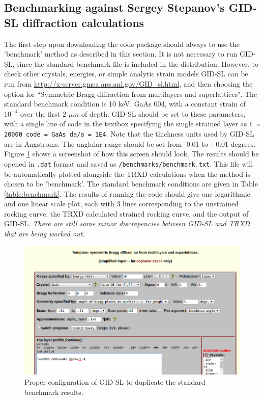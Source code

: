 \documentclass[letterpaper,11pt]{article}
\begin{document}
\subsection{Benchmarking against Sergey Stepanov's GID-SL diffraction calculations}
The first step upon downloading the code package should always to use the 'benchmark' method as described in this section.  It is not necessary to run GID-SL, since the standard benchmark file is included in the distribution.  However, to check other crystals, energies, or simple analytic strain models GID-SL can be run from \url{http://x-server.gmca.aps.anl.gov/GID_sl.html}, and then choosing the option for ``Symmetric Bragg diffraction from multilayers and superlattices". The standard benchmark condition is 10 keV, GaAs 004, with a constant strain of $10^{-4}$ over the first 2 $\mu m$ of depth. GID-SL should be set to these parameters, with a single line of code in the textbox specifying the single strained layer as \texttt{t = 20000 code = GaAs da/a = 1E4}.  Note that the thickness units used by GID-SL are in Angstroms.  The anglular range should be set from -0.01 to +0.01 degrees.  Figure \ref{fig:GID-SL} shows a screenshot of how this screen should look. The results should be opened in \texttt{.dat} format and saved as \texttt{/benchmarks/benchmark.txt}.  This file will be automatically plotted alongside the TRXD calculations when the method is chosen to be 'benchmark'.  The standard benchmark conditions are given in Table \ref{table:benchmark}.  The results of running the code should give one logarithmic and one linear scale plot, each with 3 lines corresponding to the unstrained rocking curve, the TRXD calculated strained rocking curve, and the output of GID-SL. \emph{There are still some minor discrepencies between GID-SL and TRXD that are being worked out.}

\begin{figure}
\begin{centering}
\includegraphics[scale = 0.5]{GID_SL_Benchmark_Screenshot.png}
\caption{Proper configuration of GID-SL to duplicate the standard benchmark results.}
\label{fig:GID-SL}
\end{centering}
\end{figure}
\end{document}
